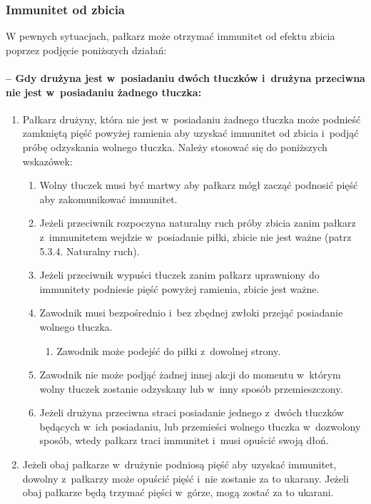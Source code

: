 \documentclass[12pt,a4paper]{article}
\begin{document}
\subsubsection{Immunitet od zbicia}

W pewnych sytuacjach, pałkarz może otrzymać immunitet od efektu zbicia
poprzez podjęcie poniższych działań:

\paragraph{-- Gdy drużyna jest w~posiadaniu dwóch tłuczków i~drużyna przeciwna nie jest w~posiadaniu żadnego tłuczka:}

\begin{enumerate}
	\item
	      Pałkarz drużyny, która nie jest w~posiadaniu żadnego tłuczka może
	      podnieść zamkniętą pięść powyżej ramienia aby uzyskać immunitet od
	      zbicia i~podjąć próbę odzyskania wolnego tłuczka. Należy stosować się
	      do poniższych wskazówek:

	      \begin{enumerate}
		      \item
		            Wolny tłuczek musi być martwy aby pałkarz mógł zacząć podnosić pięść
		            aby zakomunikować immunitet.
		      \item
		            Jeżeli przeciwnik rozpoczyna naturalny ruch próby zbicia zanim
		            pałkarz z~immunitetem wejdzie w~posiadanie piłki, zbicie nie jest
		            ważne (patrz 5.3.4. Naturalny ruch).
		      \item
		            Jeżeli przeciwnik wypuści tłuczek zanim pałkarz uprawniony do
		            immunitety podniesie pięść powyżej ramienia, zbicie jest ważne.
		      \item
		            Zawodnik musi bezpośrednio i~bez zbędnej zwłoki przejąć posiadanie
		            wolnego tłuczka.

		            \begin{enumerate}
			            \item
			                  Zawodnik może podejść do piłki z~dowolnej strony.
		            \end{enumerate}
		      \item
		            Zawodnik nie może podjąć żadnej innej akcji do momentu w~którym
		            wolny tłuczek zostanie odzyskany lub w~inny sposób przemieszczony.
		      \item
		            Jeżeli drużyna przeciwna straci posiadanie jednego z~dwóch tłuczków
		            będących w~ich posiadaniu, lub przemieści wolnego tłuczka w~dozwolony sposób, wtedy pałkarz traci immunitet i~musi opuścić swoją
		            dłoń.
	      \end{enumerate}
	\item
	      Jeżeli obaj pałkarze w~drużynie podniosą pięść aby uzyskać immunitet,
	      dowolny z~pałkarzy może opuścić pięść i~nie zostanie za to ukarany.
	      Jeżeli obaj pałkarze będą trzymać pięści w~górze, mogą zostać za to
	      ukarani.
\end{enumerate}
\end{document}
